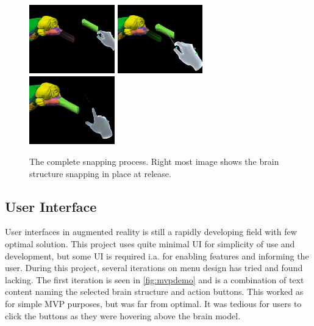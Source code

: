 \begin{figure}
    \includegraphics[width=0.33\textwidth]{fig/snaphint1.png}
    \includegraphics[width=0.33\textwidth]{fig/snaphint2.png}
    \includegraphics[width=0.33\textwidth]{fig/snaphint3.png}
    \caption{The complete snapping process. Right most image shows the brain structure snapping in place at release.}
\end{figure}




\subsection{User Interface}

User interfaces in augmented reality is still a rapidly developing field with few optimal solution. This project uses quite minimal UI for simplicity of use and development, but some UI is required i.a. for enabling features and informing the user. During this project, several iterations on menu design has tried and found lacking. The first iteration is seen in \autoref{fig:mvpdemo} and is a combination of text content naming the selected brain structure and action buttons. This worked as for simple MVP purposes, but was far from optimal. It was tedious for users to click the buttons as they were hovering above the brain model. 


